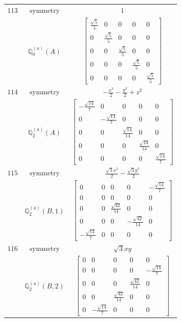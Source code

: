 \documentclass[fleqn,8pt,landscape]{jsarticle}
\begin{document}
\begin{longtable}{ccc}
$ 113 $ & $ \text{symmetry} $ & $ 1 $ \\
$  $ & $ \mathbb{Q}_{0}^{(a)}(A) $ & $ \begin{bmatrix} \frac{\sqrt{5}}{5} & 0 & 0 & 0 & 0 \\ 0 & \frac{\sqrt{5}}{5} & 0 & 0 & 0 \\ 0 & 0 & \frac{\sqrt{5}}{5} & 0 & 0 \\ 0 & 0 & 0 & \frac{\sqrt{5}}{5} & 0 \\ 0 & 0 & 0 & 0 & \frac{\sqrt{5}}{5} \end{bmatrix} $ \\ \hline
$ 114 $ & $ \text{symmetry} $ & $ - \frac{x^{2}}{2} - \frac{y^{2}}{2} + z^{2} $ \\
$  $ & $ \mathbb{Q}_{2}^{(a)}(A) $ & $ \begin{bmatrix} - \frac{\sqrt{14}}{7} & 0 & 0 & 0 & 0 \\ 0 & - \frac{\sqrt{14}}{7} & 0 & 0 & 0 \\ 0 & 0 & \frac{\sqrt{14}}{14} & 0 & 0 \\ 0 & 0 & 0 & \frac{\sqrt{14}}{14} & 0 \\ 0 & 0 & 0 & 0 & \frac{\sqrt{14}}{7} \end{bmatrix} $ \\ \hline
$ 115 $ & $ \text{symmetry} $ & $ \frac{\sqrt{3} x^{2}}{2} - \frac{\sqrt{3} y^{2}}{2} $ \\
$  $ & $ \mathbb{Q}_{2}^{(a)}(B,1) $ & $ \begin{bmatrix} 0 & 0 & 0 & 0 & - \frac{\sqrt{14}}{7} \\ 0 & 0 & 0 & 0 & 0 \\ 0 & 0 & \frac{\sqrt{42}}{14} & 0 & 0 \\ 0 & 0 & 0 & - \frac{\sqrt{42}}{14} & 0 \\ - \frac{\sqrt{14}}{7} & 0 & 0 & 0 & 0 \end{bmatrix} $ \\ \hline
$ 116 $ & $ \text{symmetry} $ & $ \sqrt{3} x y $ \\
$  $ & $ \mathbb{Q}_{2}^{(a)}(B,2) $ & $ \begin{bmatrix} 0 & 0 & 0 & 0 & 0 \\ 0 & 0 & 0 & 0 & - \frac{\sqrt{14}}{7} \\ 0 & 0 & 0 & \frac{\sqrt{42}}{14} & 0 \\ 0 & 0 & \frac{\sqrt{42}}{14} & 0 & 0 \\ 0 & - \frac{\sqrt{14}}{7} & 0 & 0 & 0 \end{bmatrix} $ \\ \hline

\end{longtable}
\end{document}
